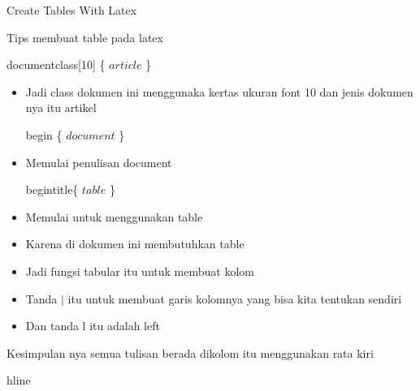 
\sloppy

\noindent \begin{center}
	Create Tables With Latex
\end{center}

 Tips membuat table pada latex\par


\noindent documentclass[10] \{ $article$ \} \par

\begin{itemize}
	\item Jadi class dokumen ini menggunaka kertas ukuran font 10 dan jenis dokumen nya itu artikel\par

begin \{ $document$ \} \par

	\item Memulai penulisan document\par

begintitle\{ $table$ \} \par

	\item Memulai untuk menggunakan table\par

	\item Karena di dokumen ini membutuhkan table
\end{itemize}\par
\begin{itemize}
	\item Jadi fungsi tabular itu untuk membuat kolom
\end{itemize}\par

\begin{itemize}
	\item Tanda $ \vert $ itu untuk membuat garis kolomnya yang bisa kita tentukan sendiri\par

	\item Dan tanda l itu adalah left
\end{itemize}\par


\noindent Kesimpulan nya semua tulisan berada dikolom itu menggunakan rata kiri\par


\noindent hline\par

